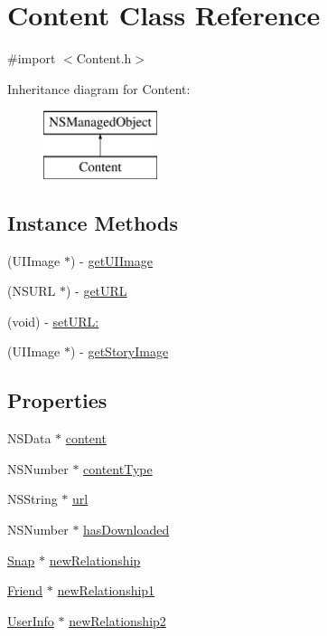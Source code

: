 \hypertarget{interface_content}{}\section{Content Class Reference}
\label{interface_content}


{\ttfamily \#import $<$Content.\+h$>$}

Inheritance diagram for Content\+:\begin{figure}[H]
\begin{center}
\leavevmode
\includegraphics[height=2.000000cm]{interface_content}
\end{center}
\end{figure}
\subsection*{Instance Methods}
\begin{DoxyCompactItemize}
\item 
(U\+I\+Image $\ast$) -\/ \hyperlink{interface_content_ac7de6656438d2919522812c65fd13875}{get\+U\+I\+Image}
\item 
(N\+S\+U\+RL $\ast$) -\/ \hyperlink{interface_content_a2a62c53bbd40efbd68e49ac6a4099574}{get\+U\+RL}
\item 
(void) -\/ \hyperlink{interface_content_a75f21306b827638829a946fe33fefab7}{set\+U\+R\+L\+:}
\item 
(U\+I\+Image $\ast$) -\/ \hyperlink{interface_content_a9297294e3130d00ad17e3a4c06a6c6ef}{get\+Story\+Image}
\end{DoxyCompactItemize}
\subsection*{Properties}
\begin{DoxyCompactItemize}
\item 
N\+S\+Data $\ast$ \hyperlink{interface_content_afc95ad6eb444142762764776c7167ce0}{content}
\item 
N\+S\+Number $\ast$ \hyperlink{interface_content_ab4dabc1aa27718c616787748076ab10b}{content\+Type}
\item 
N\+S\+String $\ast$ \hyperlink{interface_content_a69ab79cf4ff1fc815c93956fc9108dfd}{url}
\item 
N\+S\+Number $\ast$ \hyperlink{interface_content_a2889370c08c2aa08de72518277c7a72f}{has\+Downloaded}
\item 
\hyperlink{interface_snap}{Snap} $\ast$ \hyperlink{interface_content_a9fe9cbddf7a12d3fae374d6a0f20967a}{new\+Relationship}
\item 
\hyperlink{interface_friend}{Friend} $\ast$ \hyperlink{interface_content_acdbcc4a73539ea8120df429fff076ae4}{new\+Relationship1}
\item 
\hyperlink{interface_user_info}{User\+Info} $\ast$ \hyperlink{interface_content_a548aaf829a86fcdfdbe44b8c1964340e}{new\+Relationship2}
\end{DoxyCompactItemize}


